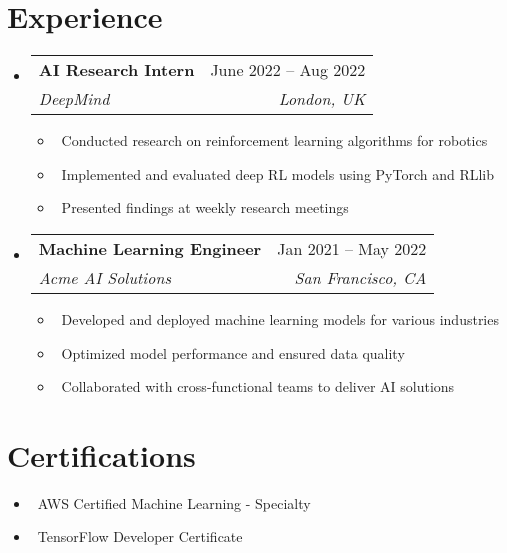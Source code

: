 \documentclass[a4paper,11pt]{article}
\makeatletter
\newcommand{\resumeItem}[1]{\item\small{#1}}
\newcommand{\resumeSubheading}[4]{
\vspace{-1pt}\item
  \begin{tabular*}{0.97\textwidth}[t]{l@{\extracolsep{\fill}}r}
    \textbf{#1} & #2 \\
    \textit{#3} & \textit{#4} \\
  \end{tabular*}\vspace{-7pt}
}
\newcommand{\resumeSubHeadingList}{\begin{itemize}[leftmargin=0.15in, label={}]}
\newcommand{\resumeSubHeadingListEnd}{\end{itemize}}
\makeatother
\begin{document}
\section{Experience}
\resumeSubHeadingList
  \resumeSubheading
      {AI Research Intern}{June 2022 -- Aug 2022}
      {DeepMind}{London, UK}
      \resumeSubHeadingList
          \resumeItem{\textbullet\ Conducted research on reinforcement learning algorithms for robotics}
          \resumeItem{\textbullet\ Implemented and evaluated deep RL models using PyTorch and RLlib}
          \resumeItem{\textbullet\ Presented findings at weekly research meetings}
      \resumeSubHeadingListEnd
  \resumeSubheading
      {Machine Learning Engineer}{Jan 2021 -- May 2022}
      {Acme AI Solutions}{San Francisco, CA}
      \resumeSubHeadingList
          \resumeItem{\textbullet\ Developed and deployed machine learning models for various industries}
          \resumeItem{\textbullet\ Optimized model performance and ensured data quality}
          \resumeItem{\textbullet\ Collaborated with cross-functional teams to deliver AI solutions}
      \resumeSubHeadingListEnd
\resumeSubHeadingListEnd


\section{Certifications}
\resumeSubHeadingList
  \resumeItem{\textbullet\ AWS Certified Machine Learning - Specialty}
  \resumeItem{\textbullet\ TensorFlow Developer Certificate}
\resumeSubHeadingListEnd
\end{document}
